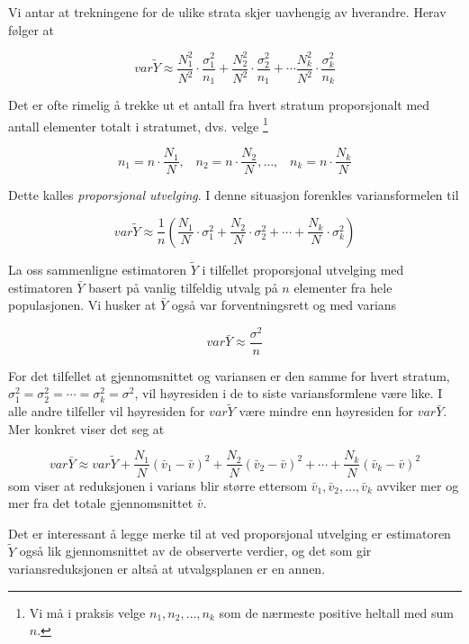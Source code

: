 \noindent Vi antar at trekningene for de ulike strata skjer uavhengig av
hverandre. Herav følger at

\[ var\tilde{Y} \approx \frac{N_1^2}{N^2} \cdot \frac{{\sigma}_1^2}{n_1}+
         \frac{N_2^2}{N^2} \cdot \frac{{\sigma}_2^2}{n_1}+ \cdots
         \frac{N_k^2}{N^2} \cdot \frac{{\sigma}_k^2}{n_k}   \]

\noindent Det er ofte rimelig å trekke ut et antall fra hvert stratum
proporsjonalt med antall elementer totalt i stratumet, dvs. velge
\footnote{Vi må i praksis velge $n_1, n_2, \ldots, n_k$ som de
nærmeste positive heltall med sum $n$.}

\[ n_1=n \cdot \frac{N_1}{N},\;\;\; n_2=n \cdot \frac{N_2}{N}, \ldots ,\;\;\;
                               n_k=n \cdot \frac{N_k}{N}        \]

\noindent Dette kalles {\em proporsjonal utvelging}.  I denne situasjon
forenkles varians\-formelen til

\[ var\tilde{Y} \approx \frac{1}{n}(\frac{N_1}{N} \cdot {{\sigma}_1^2}+
                           \frac{N_2}{N} \cdot {{\sigma}_2^2}+\cdots +
                                      \frac{N_k}{N} \cdot {{\sigma}_k^2}) \]

\noindent La oss sammenligne estimatoren $\tilde{Y}$ i tilfellet proporsjonal
utvelging med estimatoren $\bar{Y}$ basert på vanlig tilfeldig utvalg
på $n$ elementer fra hele po\-pu\-la\-sjonen.  Vi husker at $\bar{Y}$ også var
forventningsrett og med varians

\[   var\bar{Y} \approx \frac{{\sigma}^2}{n}        \]

\noindent For det tilfellet at gjennomsnittet og variansen er den samme for
hvert stratum, ${\sigma}_1^2 = {\sigma}_2^2 = \cdots = {\sigma}_k^2 =
{\sigma}^2$, vil høyresiden i de to siste varians\-formlene være like.
I alle andre tilfeller vil høyresiden for $var\tilde{Y}$ være mindre
enn høyresiden for $var\bar{Y}$. Mer konkret viser det seg at

\[ var\bar{Y} \approx var\tilde{Y}+\frac{N_1}{N}{({\bar{v}}_1-\bar{v})}^2     
                       +\frac{N_2}{N}{({\bar{v}}_2-\bar{v})}^2 + \cdots    
               +\frac{N_k}{N}{({\bar{v}}_k-\bar{v})}^2     \]
\noindent som viser at reduksjonen i varians blir større ettersom
${\bar v}_1, {\bar v}_2, \ldots, {\bar v}_k$ avviker mer og mer fra det totale
gjennomsnittet $\bar{v}$.

Det er interessant å legge merke til at ved proporsjonal utvelging er
estimatoren $\tilde{Y}$ også lik gjennomsnittet av de observerte verdier, 
og det som gir variansreduksjonen er altså at utvalgsplanen er en annen.

